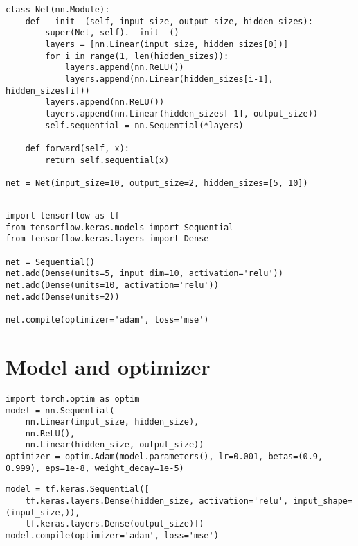 \documentclass[24pt]{article}
\begin{document}
\begin{multicols}{2}
\begin{lstlisting}
class Net(nn.Module):
    def __init__(self, input_size, output_size, hidden_sizes):
        super(Net, self).__init__()
        layers = [nn.Linear(input_size, hidden_sizes[0])]
        for i in range(1, len(hidden_sizes)):
            layers.append(nn.ReLU())  
            layers.append(nn.Linear(hidden_sizes[i-1], hidden_sizes[i]))
        layers.append(nn.ReLU())  
        layers.append(nn.Linear(hidden_sizes[-1], output_size))
        self.sequential = nn.Sequential(*layers)

    def forward(self, x):
        return self.sequential(x)

net = Net(input_size=10, output_size=2, hidden_sizes=[5, 10])


\end{lstlisting}
\columnbreak

\begin{lstlisting}
import tensorflow as tf
from tensorflow.keras.models import Sequential
from tensorflow.keras.layers import Dense

net = Sequential()
net.add(Dense(units=5, input_dim=10, activation='relu'))  
net.add(Dense(units=10, activation='relu'))  
net.add(Dense(units=2))  

net.compile(optimizer='adam', loss='mse')

\end{lstlisting}
\end{multicols}

\section{Model and optimizer}


\begin{multicols}{2}
\begin{lstlisting}
import torch.optim as optim
model = nn.Sequential(
    nn.Linear(input_size, hidden_size),
    nn.ReLU(),
    nn.Linear(hidden_size, output_size))
optimizer = optim.Adam(model.parameters(), lr=0.001, betas=(0.9, 0.999), eps=1e-8, weight_decay=1e-5) 
\end{lstlisting}
\columnbreak

\begin{lstlisting}
model = tf.keras.Sequential([
    tf.keras.layers.Dense(hidden_size, activation='relu', input_shape=(input_size,)),
    tf.keras.layers.Dense(output_size)])
model.compile(optimizer='adam', loss='mse')
\end{lstlisting}

\end{multicols}
\end{document}
